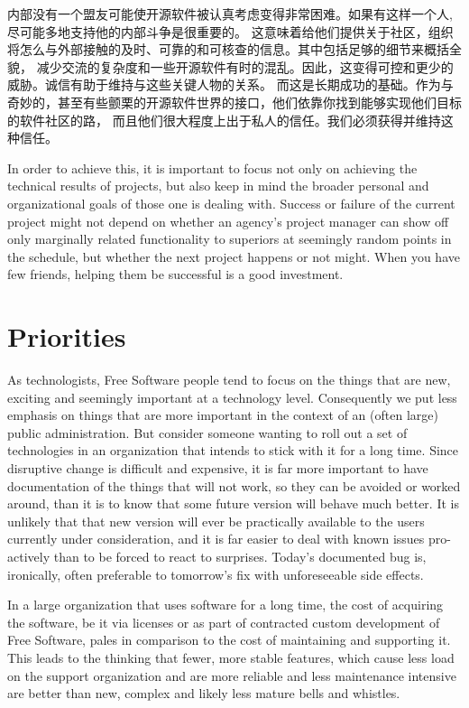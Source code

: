 内部没有一个盟友可能使开源软件被认真考虑变得非常困难。如果有这样一个人,尽可能多地支持他的内部斗争是很重要的。
这意味着给他们提供关于社区，组织将怎么与外部接触的及时、可靠的和可核查的信息。其中包括足够的细节来概括全貌，
减少交流的复杂度和一些开源软件有时的混乱。因此，这变得可控和更少的威胁。诚信有助于维持与这些关键人物的关系。
而这是长期成功的基础。作为与奇妙的，甚至有些颤栗的开源软件世界的接口，他们依靠你找到能够实现他们目标的软件社区的路，
而且他们很大程度上出于私人的信任。我们必须获得并维持这种信任。


In order to achieve this, it is important to focus not only on achieving
the technical results of projects, but also keep in mind the broader personal and organizational
goals of those one is dealing with. Success or failure of the current
project might not depend on whether an agency's project manager can show off
only marginally related functionality to superiors at seemingly random points
in the schedule, but whether the next project happens or not might. When you have
few friends, helping them be successful is a good investment.

\section*{Priorities}

As technologists, Free Software people tend to focus on the things that are
new, exciting and seemingly important at a technology level. Consequently we
put less emphasis on things that are more important in the context of an (often
large) public administration. But consider someone wanting to roll out a
set of technologies in an organization that intends to stick with it for a long
time. Since disruptive change is difficult and expensive, it is far more
important to have documentation of the things that will not work, so they can
be avoided or worked around, than it is to know that some future version will
behave much better. It is unlikely that that new version will ever be
practically available to the users currently under consideration, and it is far
easier to deal with known issues pro-actively than to be forced to react to
surprises.  Today's documented bug is, ironically, often preferable to
tomorrow's fix with unforeseeable side effects.

In a large organization that uses software for a long time, the cost of acquiring
the software, be it via licenses or as part of contracted custom development of
Free Software, pales in comparison to the cost of maintaining and supporting it.
This leads to the thinking that fewer, more stable features, which cause less load
on the support organization and are more reliable and less maintenance intensive
are better than new, complex and likely less mature bells and whistles.

